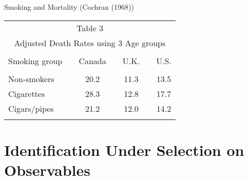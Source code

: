 \documentclass{beamer}
\numberwithin{equation}{section}
\begin{document}
\begin{frame}{Smoking and Mortality (Cochran (1968))}

\begin{center}
 \begin{tabular}{lcccccc}
 \multicolumn{7}{c}{\small\sc Table 3}\\
 \multicolumn{7}{c}{\footnotesize\sc Adjusted Death Rates using 3 Age groups}
 \vspace*{0.1cm}\\\hline\hline\\
 Smoking group&&Canada&&U.K.&&U.S.\\\hline\\
 Non-smokers&&20.2&&11.3&&13.5\\
 Cigarettes&&28.3&&12.8&&17.7\\
 Cigars/pipes&&21.2&&12.0&&14.2\\\hline\\
 \end{tabular}
\end{center}

\end{frame}

\section{Identification Under Selection on
Observables}\label{identification-under-selection-on-observables}
\end{document}
